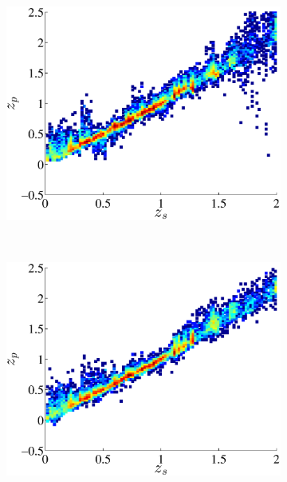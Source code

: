 \documentclass[useAMS,usenatbib,fleqn]{mn2e}
\begin{document}
\begin{figure}
        \centering
        \begin{subfigure}[b]{0.3\columnwidth}
                \includegraphics[width=\textwidth]{figures/23_0.eps}
        \end{subfigure}
        ~
        \begin{subfigure}[b]{0.3\columnwidth}
                \includegraphics[width=\textwidth]{figures/23_L.eps}
        \end{subfigure}
        ~
        \begin{subfigure}[b]{0.3\columnwidth}

\end{subfigure}
\end{figure}
\end{document}
